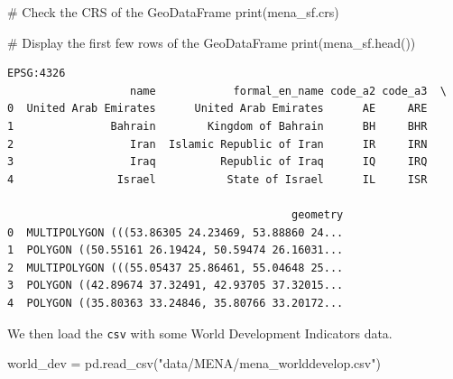 \documentclass[
  letterpaper,
  DIV=11,
  numbers=noendperiod]{scrreprt}
\newenvironment{Shaded}{\begin{snugshade}}{\end{snugshade}}
\newcommand{\BuiltInTok}[1]{\textcolor[rgb]{0.00,0.23,0.31}{#1}}
\newcommand{\CommentTok}[1]{\textcolor[rgb]{0.37,0.37,0.37}{#1}}
\newcommand{\NormalTok}[1]{\textcolor[rgb]{0.00,0.23,0.31}{#1}}
\newcommand{\OperatorTok}[1]{\textcolor[rgb]{0.37,0.37,0.37}{#1}}
\newcommand{\StringTok}[1]{\textcolor[rgb]{0.13,0.47,0.30}{#1}}
\begin{document}
\begin{tcolorbox}[enhanced jigsaw, breakable, toptitle=1mm, titlerule=0mm, opacityback=0, colback=white, coltitle=black, leftrule=.75mm, bottomtitle=1mm, colframe=quarto-callout-tip-color-frame, colbacktitle=quarto-callout-tip-color!10!white, toprule=.15mm, bottomrule=.15mm, arc=.35mm, rightrule=.15mm, opacitybacktitle=0.6, title=\textcolor{quarto-callout-tip-color}{\faLightbulb}\hspace{0.5em}{Answer}, left=2mm]

\begin{Shaded}
\begin{Highlighting}[]
\CommentTok{\# Check the CRS of the GeoDataFrame}
\BuiltInTok{print}\NormalTok{(mena\_sf.crs)}

\CommentTok{\# Display the first few rows of the GeoDataFrame}
\BuiltInTok{print}\NormalTok{(mena\_sf.head())}
\end{Highlighting}
\end{Shaded}

\begin{verbatim}
EPSG:4326
                   name            formal_en_name code_a2 code_a3  \
0  United Arab Emirates      United Arab Emirates      AE     ARE   
1               Bahrain        Kingdom of Bahrain      BH     BHR   
2                  Iran  Islamic Republic of Iran      IR     IRN   
3                  Iraq          Republic of Iraq      IQ     IRQ   
4                Israel           State of Israel      IL     ISR   

                                            geometry  
0  MULTIPOLYGON (((53.86305 24.23469, 53.88860 24...  
1  POLYGON ((50.55161 26.19424, 50.59474 26.16031...  
2  MULTIPOLYGON (((55.05437 25.86461, 55.04648 25...  
3  POLYGON ((42.89674 37.32491, 42.93705 37.32015...  
4  POLYGON ((35.80363 33.24846, 35.80766 33.20172...  
\end{verbatim}

\end{tcolorbox}

We then load the \texttt{csv} with some World Development Indicators
data.

\begin{Shaded}
\begin{Highlighting}[]
\NormalTok{world\_dev }\OperatorTok{=}\NormalTok{ pd.read\_csv(}\StringTok{"data/MENA/mena\_worlddevelop.csv"}\NormalTok{)}
\end{Highlighting}
\end{Shaded}
\end{document}

